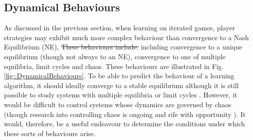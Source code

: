\documentclass[sigconf,anonymous]{aamas}
\begin{document}
\subsection{Dynamical Behaviours}
\label{sec::DynamicalBehaviours}

    As discussed in the previous section, when learning on iterated games, player
    strategies may exhibit much more complex behaviour than
    convergence to a Nash Equilibrium (NE), \st{These behaviours include:}
    including convergence to a unique
    equilibrium (though not always to an NE), convergence to one of
    multiple equilibria, limit cycles and chaos. These behaviours are
    illustrated in Fig.\ref{fig::DynamicalBehaviours}. To be able to predict the behaviour of a learning algorithm, it should ideally converge to a stable equilibrium
    although it is still possible to study systems with multiple
    equilibria or limit cycles \cite{Strogatz2000}. However, it would
    be difficult to control systems whose dynamics are governed by
    chaos (though research into controlling chaos is ongoing and rife
    with opportunity \cite{Fradkov2009}). It would, therefore, be a useful endeavour to
    determine the conditions under which these sorts of behaviours
    arise.
\end{document}
